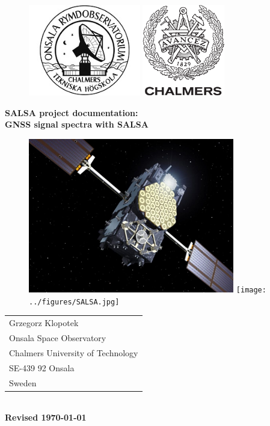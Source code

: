 \begin{titlepage}

\begin{figure}[t]
\vspace{-2cm}
\centering
\includegraphics[height=4cm]{../figures/OSO-logo.jpg}
\hspace{4cm}
\includegraphics[height=4cm]{../figures/CHALMERS-logo.pdf}
\vspace{1cm}
\end{figure}

\begin{center}
\Huge \textbf{
SALSA project documentation: 		\\
\bigskip
GNSS signal spectra with SALSA
}
\end{center}

\begin{figure}[!h]
\centering
\includegraphics[width=9cm]{../figures/GALILEO_SAT.jpg}
\texttt{[image: ../figures/SALSA.jpg]}
\end{figure}


\begin{center}
\begin{tabular}{l}
Grzegorz Klopotek\\
Onsala Space Observatory		\\
Chalmers University of Technology	\\
SE-439 92 Onsala			\\
Sweden					\\
\end{tabular}\\
\vspace{0.5cm}
\yyyymmdddate
{\bf Revised \today \, \currenttime}
\end{center}

\end{titlepage}

